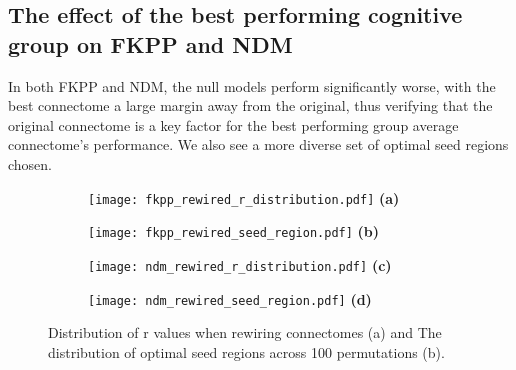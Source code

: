 \subsection{The effect of the best performing cognitive group on FKPP and NDM}
In both FKPP and NDM, the null models perform significantly worse, with the best connectome a large margin away from the original, thus verifying that the original connectome is a key factor for the best performing group average connectome's performance. We also see a more diverse set of optimal seed regions chosen.
\begin{figure}[h]
    \centering
    \begin{subfigure}[t]{0.4\linewidth}
        \centering
        \texttt{[image: fkpp\_rewired\_r\_distribution.pdf]}
        \vspace{1mm}
        \textbf{(a)}
    \end{subfigure}
    \begin{subfigure}[t]{0.55\linewidth}
        \centering
        \texttt{[image: fkpp\_rewired\_seed\_region.pdf]}
        \vspace{1mm}
        \textbf{(b)}
    \end{subfigure}
    \vskip 4mm
    \begin{subfigure}[t]{0.4\linewidth}
        \centering
        \texttt{[image: ndm\_rewired\_r\_distribution.pdf]}
        \vspace{1mm}
        \textbf{(c)}
    \end{subfigure}
    \begin{subfigure}[t]{0.55\linewidth}
        \centering
        \texttt{[image: ndm\_rewired\_seed\_region.pdf]}
        \vspace{1mm}
        \textbf{(d)}
    \end{subfigure}
    \caption{Distribution of r values when rewiring connectomes (a) and The distribution of optimal seed regions across 100 permutations (b).}
    \label{fig:null_model_rewire_connectomes}
\end{figure}



